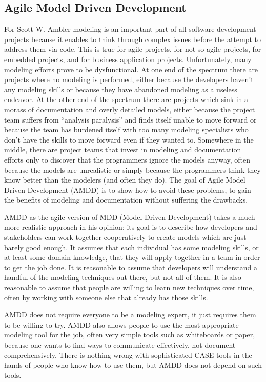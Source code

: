 \documentclass[10pt, a4paper, twocolumn]{article}
\begin{document}
\subsection{Agile Model Driven Development}

For Scott W. Ambler \cite{1} modeling is an important part of all software development projects because it enables to think through complex issues before the attempt to address them via code. This is true for agile projects, for not-so-agile projects, for embedded projects, and for business application projects. Unfortunately, many modeling efforts prove to be dysfunctional. At one end of the spectrum there are projects where no modeling is performed, either because the developers haven’t any modeling skills or because they have abandoned modeling as a useless endeavor. At the other end of the spectrum there are projects which sink in a morass of documentation and overly detailed models, either because the project team suffers from “analysis paralysis” and finds itself unable to move forward or because the team has burdened itself with too many modeling specialists who don’t have the skills to move forward even if they wanted to. Somewhere in the middle, there are project teams that invest in modeling and documentation efforts only to discover that the programmers ignore the models anyway, often because the models are unrealistic or simply because the programmers think they know better than the modelers (and often they do). The goal of Agile Model Driven Development (AMDD) is to show how to avoid these problems, to gain the benefits of modeling and documentation without suffering the drawbacks.

AMDD as the agile version of MDD (Model Driven Development) takes a much more realistic approach in his opinion: its goal is to describe how developers and stakeholders can work together cooperatively to create models which are just barely good enough. It assumes that each individual has some modeling skills, or at least some domain knowledge, that they will apply together in a team in order to get the job done. It is reasonable to assume that developers will understand a handful of the modeling techniques out there, but not all of them. It is also reasonable to assume that people are willing to learn new techniques over time, often by working with someone else that already has those skills.

AMDD does not require everyone to be a modeling expert, it just requires them to be willing to try. AMDD also allows people to use the most appropriate modeling tool for the job, often very simple tools such as whiteboards or paper, because one wants to find ways to communicate effectively, not document comprehensively. There is nothing wrong with sophisticated CASE tools in the hands of people who know how to use them, but AMDD does not depend on such tools.
\end{document}
